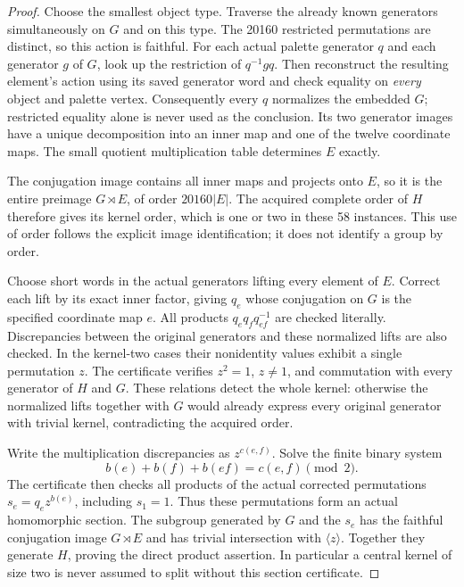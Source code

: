 \documentclass[11pt]{article}
\begin{document}
\begin{proof}
Choose the smallest object type. Traverse the already known generators
simultaneously on $G$ and on this type. The 20160 restricted permutations
are distinct, so this action is faithful. For each actual palette generator
$q$ and each generator $g$ of $G$, look up the restriction of $q^{-1}gq$.
Then reconstruct the resulting element's action using its saved generator
word and check equality on \emph{every} object and palette vertex.
Consequently every $q$ normalizes the embedded $G$; restricted equality
alone is never used as the conclusion. Its two generator images have a
unique decomposition into an inner map and one of the twelve coordinate
maps. The small quotient multiplication table determines $E$ exactly.

The conjugation image contains all inner maps and projects onto $E$,
so it is the entire preimage $G\rtimes E$, of order $20160|E|$.
The acquired complete order of $H$ therefore gives its kernel order,
which is one or two in these 58 instances. This use of order follows
the explicit image identification; it does not identify a group by order.

Choose short words in the actual generators lifting every element of $E$.
Correct each lift by its exact inner factor, giving $q_e$ whose conjugation
on $G$ is the specified coordinate map $e$. All products
$q_e q_f q_{ef}^{-1}$ are checked literally. Discrepancies between the
original generators and these normalized lifts are also checked. In the
kernel-two cases their nonidentity values exhibit a single permutation $z$.
The certificate verifies $z^2=1$, $z\ne1$, and commutation with every
generator of $H$ and $G$. These relations detect the whole kernel: otherwise
the normalized lifts together with $G$ would already express every original
generator with trivial kernel, contradicting the acquired order.

Write the multiplication discrepancies as $z^{c(e,f)}$. Solve the finite
binary system
\[
 b(e)+b(f)+b(ef)=c(e,f)\pmod2.
\]
The certificate then checks all products of the actual corrected permutations
$s_e=q_ez^{b(e)}$, including $s_1=1$. Thus these permutations form an
actual homomorphic section. The subgroup generated by $G$ and the $s_e$
has the faithful conjugation image $G\rtimes E$ and has trivial intersection
with $\langle z\rangle$. Together they generate $H$, proving the direct
product assertion. In particular a central kernel of size two is never
assumed to split without this section certificate.
\end{proof}
\end{document}
